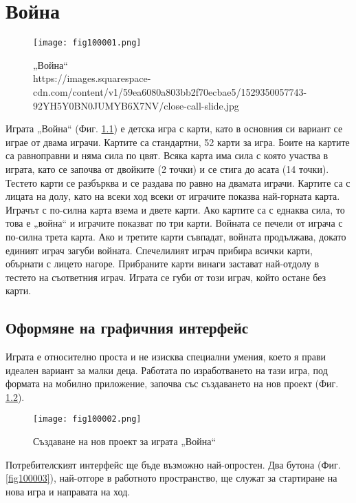 ﻿\chapter{Война}

\begin{figure}[H]
  \centering
  \texttt{[image: fig100001.png]}
  \caption{„Война“ \\ https://images.squarespace-cdn.com/content/v1/59ea6080a803bb2f70ecbae5/1529350057743-92YH5Y0BN0JUMYB6X7NV/close-call-slide.jpg}
\label{fig100001}
\end{figure}

Играта „Война“ (Фиг. \ref{fig100001}) е детска игра с карти, като в основния си вариант се играе от двама играчи. Картите са стандартни, 52 карти за игра. Боите на картите са равноправни и няма сила по цвят. Всяка карта има сила с която участва в играта, като се започва от двойките (2 точки) и се стига до асата (14 точки). Тестето карти се разбърква и се раздава по равно на двамата играчи. Картите са с лицата на долу, като на всеки ход всеки от играчите показва най-горната карта. Играчът с по-силна карта взема и двете карти. Ако картите са с еднаква сила, то това е „война“ и играчите показват по три карти. Войната се печели от играча с по-силна трета карта. Ако и третите карти съвпадат, войната продължава, докато единият играч загуби войната. Спечелилият играч прибира всички карти, обърнати с лицето нагоре. Прибраните карти винаги застават най-отдолу в тестето на съответния играч. Играта се губи от този играч, който остане без карти. 

\section{Оформяне на графичния интерфейс}

Играта е относително проста и не изисква специални умения, което я прави идеален вариант за малки деца. Работата по изработването на тази игра, под формата на мобилно приложение, започва със създаването на нов проект (Фиг. \ref{fig100002}).

\begin{figure}[H]
  \centering
  \texttt{[image: fig100002.png]}
  \caption{Създаване на нов проект за играта „Война“}
\label{fig100002}
\end{figure}

Потребителският интерфейс ще бъде възможно най-опростен. Два бутона (Фиг. \ref{fig100003}), най-отгоре в работното пространство, ще служат за стартиране на нова игра и направата на ход.

